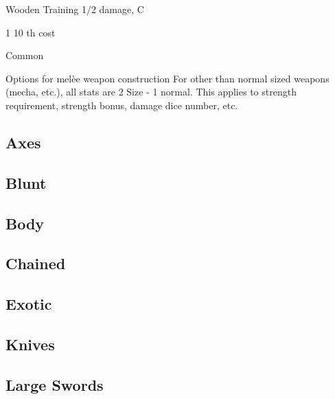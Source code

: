 \documentclass[twoside]{book}
\begin{document}
                  
                   Wooden Training 
                   1/2 damage, C 
                        
                             1  10
                              th 
                           cost     
                    
                   Common   
                  
                
                Options for melèe weapon construction
              For other than normal sized weapons (mecha, etc.),
               all stats are 
                     2      Size    -
                      1   
                     normal. This applies to strength
                  requirement, strength bonus, damage dice number, etc.
            
\subsection{Axes}
    
\subsection{Blunt}
    
\subsection{Body}
    
\subsection{Chained}
    
\subsection{Exotic}
    
\subsection{Knives}
    
\subsection{Large Swords}
    
\end{document}
